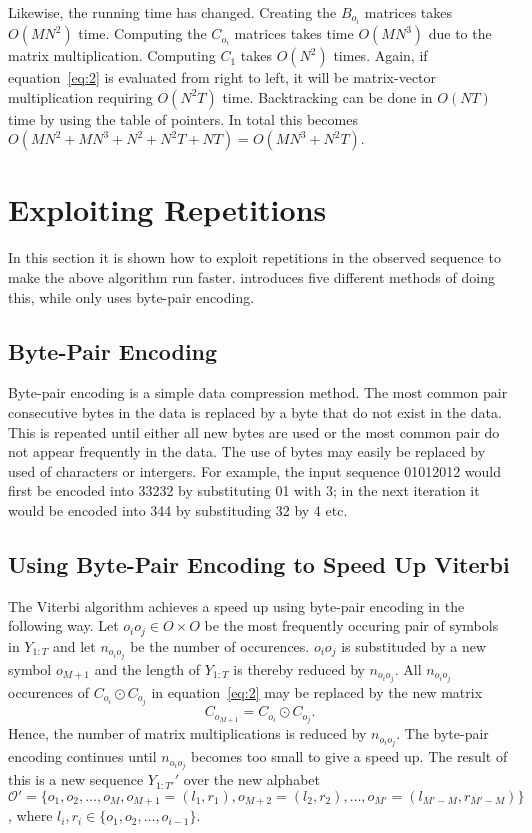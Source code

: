 Likewise, the running time has changed. Creating the $B_{o_i}$ matrices takes
$O(M N^2)$ time. Computing the $C_{o_i}$ matrices takes time $O(M N^3)$ due to
the matrix multiplication. Computing $C_1$ takes $O(N^2)$ times. Again, if
equation~\eqref{eq:2} is evaluated from right to left, it will be matrix-vector
multiplication requiring $O(N^2 T)$ time. Backtracking can be done in $O(NT)$
time by using the table of pointers. In total this becomes $O(M N^2 + M N^3 +
N^2 + N^2 T + NT) = O(M N^3 + N^2 T)$.

\section{Exploiting Repetitions}
\label{sec:expl-repet}

In this section it is shown how to exploit repetitions in the observed sequence
to make the above algorithm run faster. \citet{lifshits2009speeding} introduces
five different methods of doing this, while \citet{sand2013ziphmmlib} only uses
byte-pair encoding.

\subsection{Byte-Pair Encoding}

Byte-pair encoding is a simple data compression method. The most common pair
consecutive bytes in the data is replaced by a byte that do not exist in the
data. This is repeated until either all new bytes are used or the most common
pair do not appear frequently in the data. The use of bytes may easily be
replaced by used of characters or intergers. For example, the input sequence
01012012 would first be encoded into 33232 by substituting 01 with 3; in the
next iteration it would be encoded into 344 by substituding 32 by 4 etc.

\subsection{Using Byte-Pair Encoding to Speed Up Viterbi}

The Viterbi algorithm achieves a speed up using byte-pair encoding in the
following way. Let $o_i o_j \in O \times O$ be the most frequently occuring
pair of symbols in $Y_{1:T}$ and let $n_{o_i o_j}$ be the number of
occurences. $o_i o_j$ is substituded by a new symbol $o_{M + 1}$ and the length
of $Y_{1:T}$ is thereby reduced by $n_{o_i o_j}$. All $n_{o_i o_j}$ occurences
of $C_{o_i} \odot C_{o_j}$ in equation~\eqref{eq:2} may be replaced by the new
matrix
\begin{equation*}
  C_{o_{M + 1}} = C_{o_i} \odot C_{o_j}.
\end{equation*}
Hence, the number of matrix multiplications is reduced by $n_{o_i o_j}$. The
byte-pair encoding continues until $n_{o_i o_j}$ becomes too small to give a
speed up.  The result of this is a new sequence
$Y_{1:T'}'$ over the new alphabet
$\mathcal{O}' = \{o_1, o_2, \dots, o_M, o_{M + 1} = (l_1, r_1), o_{M + 2} =
(l_2, r_2), \dots, o_{M'} = (l_{M' - M}, r_{M' - M}) \}$,
where $l_i, r_i \in \{ o_1, o_2, \dots, o_{i - 1} \}$.

